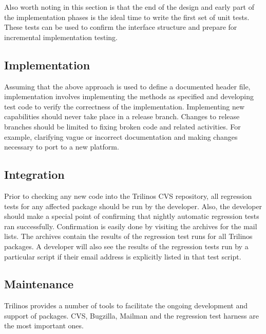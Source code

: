 \documentclass[12pt,relax]{TrilinosDevGuide}
\begin{document}
Also worth noting in this section is that the end of the design and
early part of the implementation phases is the ideal time to
write the first set of unit tests.  These tests can be used to confirm
the interface structure and prepare for incremental implementation testing.

\subsection{Implementation}
Assuming that the above approach is used to define a documented header
file, implementation involves implementing the methods as specified
and developing test code to verify the correctness of the implementation.
Implementing new capabilities should never take place in a release branch.  
Changes to release branches should be limited to fixing broken code and 
related activities.  For example, clarifying vague or incorrect documentation 
and making changes necessary to port to a new platform.

\subsection{Integration}
Prior to checking any new code into the Trilinos CVS repository, all
regression tests for any affected package should be run by the
developer.  Also, the developer should make a special point of
confirming that nightly automatic regression tests ran successfully.
Confirmation is easily done by visiting the archives for the 
 mail lists.  
The archives contain the results of the regression test runs for all 
Trilinos packages.  A developer will also see the results of 
the regression tests run by a particular script if their 
email address is explicitly listed in that test script.

\subsection{Maintenance}
Trilinos provides a number of tools to facilitate the ongoing
development and support of packages.  CVS, Bugzilla, Mailman and the
regression test harness are the most important ones.
\end{document}
